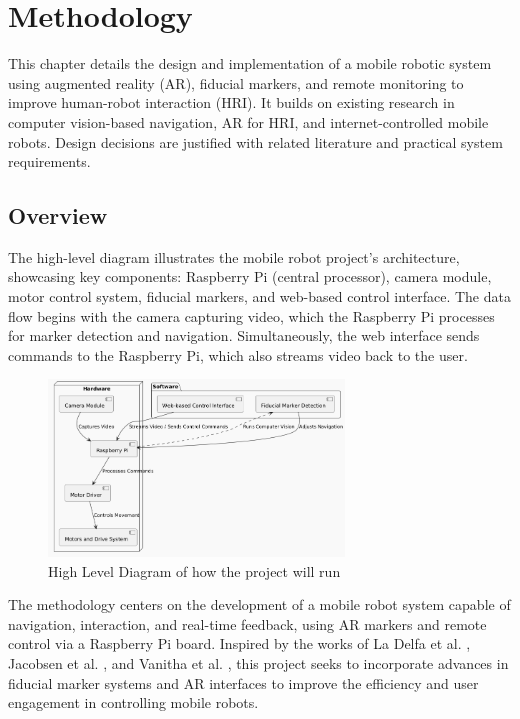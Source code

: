 \chapter{\label{ch:methodology} Methodology}
This chapter details the design and implementation of a mobile robotic system using augmented reality (AR), fiducial markers, and remote monitoring to improve human-robot interaction (HRI). It builds on existing research in computer vision-based navigation, AR for HRI, and internet-controlled mobile robots. Design decisions are justified with related literature and practical system requirements.

\section{\label{sec:overview} Overview}
The high-level diagram illustrates the mobile robot project's architecture, showcasing key components: Raspberry Pi (central processor), camera module, motor control system, fiducial markers, and web-based control interface. The data flow begins with the camera capturing video, which the Raspberry Pi processes for marker detection and navigation. Simultaneously, the web interface sends commands to the Raspberry Pi, which also streams video back to the user.

\begin{figure}[H]
	\centering
	\includegraphics[width=0.7\textwidth]{ch3/figs/diagram.png}
	\caption{High Level Diagram of how the project will run}
	\label{fig:high_level_diagram}
\end{figure}

The methodology centers on the development of a mobile robot system capable of navigation, interaction, and real-time feedback, using AR markers and remote control via a Raspberry Pi board. Inspired by the works of La Delfa et al. \cite{delfa2015}, Jacobsen et al. \cite{jacobsen2018}, and Vanitha et al. \cite{vanitha2016}, this project seeks to incorporate advances in fiducial marker systems and AR interfaces to improve the efficiency and user engagement in controlling mobile robots.

